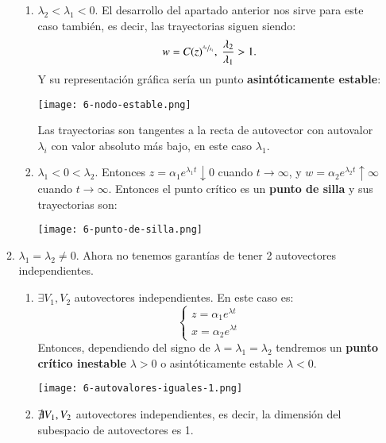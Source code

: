 \begin{enumerate}
\begin{enumerate}
\begin{enumerate}
            \item $\lambda_2 < \lambda_1 < 0$.
            El desarrollo del apartado anterior nos sirve para este caso también, es decir, las trayectorias siguen siendo:
            $$
                w = C (z)^{\sfrac{\lambda_2}{\lambda_1}},\ \frac{\lambda_2}{\lambda_1} > 1.
            $$
            Y su representación gráfica sería un punto \textbf{asintóticamente estable}:
            \begin{center}
                \texttt{[image: 6-nodo-estable.png]}
            \end{center}
            Las trayectorias son tangentes a la recta de autovector con autovalor $\lambda_i$ con valor absoluto más bajo, en este caso $\lambda_1$.
            \item $\lambda_1 < 0 < \lambda_2$.
            Entonces $z = \alpha_1 e^{\lambda_1t} \downarrow 0$ cuando $t\to\infty$, y $w = \alpha_2 e^{\lambda_2t} \uparrow \infty$ cuando $t\to\infty$. Entonces el punto crítico es un \textbf{punto de silla} y sus trayectorias son:
            \begin{center}
                \texttt{[image: 6-punto-de-silla.png]}
            \end{center}
        \end{enumerate}
        \item $\lambda_1 = \lambda_2 \neq 0$.
        Ahora no tenemos garantías de tener 2 autovectores independientes.
        \begin{enumerate}
            \item $\exists V_1, V_2$ autovectores independientes. En este caso es:
            $$
            \begin{cases}
                z = \alpha_1 e^{\lambda t}\\
                x = \alpha_2 e^{\lambda t}
            \end{cases}
            $$
            Entonces, dependiendo del signo de $\lambda = \lambda_1 = \lambda_2$ tendremos un \textbf{punto crítico inestable} $\lambda > 0$ o asintóticamente estable $\lambda < 0$.
            \begin{center}
                \texttt{[image: 6-autovalores-iguales-1.png]}
            \end{center}
            \item $\not\exists V_1, V_2$ autovectores independientes, es decir, la dimensión del subespacio de autovectores es 1.\\

\end{enumerate}
\end{enumerate}
\end{enumerate}
